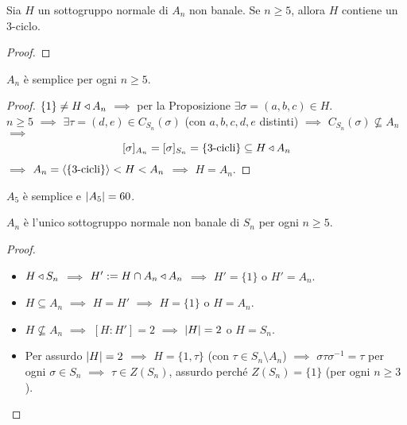 \begin{lemm}
Sia $H$ un sottogruppo normale di $A_n$ non banale. Se $n \ge 5$, allora $H$ contiene un $3$-ciclo.
\end{lemm}

\begin{proof}
\end{proof}

\begin{teor}
$A_n$ è semplice per ogni $n \ge 5$.
\end{teor}

\begin{proof}
$\{1\}\ne H \triangleleft A_n$ $\implies$ per la Proposizione $\exists\sigma=(a,b,c)\in H$. \\
$n\ge5$ $\implies$ $\exists\tau=(d,e)\in C_{S_n}(\sigma)$ (con $a,b,c,d,e$ distinti) $\implies$ $ C_{S_n}(\sigma)\not\subseteq A_n$ $\implies$
\[
[\sigma]_{A_n}=[\sigma]_{S_n}=\{\text{$3$-cicli}\}\subseteq H \triangleleft A_n
\]
$\implies$ $A_n=\left\langle\{\text{$3$-cicli}\}\right\rangle<H<A_n$ $\implies$ $H=A_n$.
\end{proof}
\begin{coro}
$A_5$ è semplice e $\left\lvert A_5\right\rvert=60$.
\end{coro}



\begin{coro}
$A_n$ è l'unico sottogruppo normale non banale di $S_n$ per ogni $n\ge5$.
\end{coro}
\begin{proof}
\begin{itemize}
\item $H \triangleleft S_n$ $\implies$ $H':=H\cap A_n \triangleleft A_n$ $\implies$ $H'=\{1\}$ o $H'=A_n$.
\item $H\subseteq A_n$ $\implies$ $H=H'$ $\implies$ $H=\{1\}$ o $H=A_n$.
\item $H\not\subseteq A_n$ $\implies$ $[H:H']=2$ $\implies$ $\left\lvert H\right\rvert=2$ o $H=S_n$.
\item Per assurdo $\left\lvert H\right\rvert=2$ $\implies$ $H=\{1,\tau\}$ (con $\tau\in S_n\setminus A_n$) $\implies$ $\sigma\tau\sigma^{-1}=\tau$ per ogni $\sigma\in S_n$ $\implies$ $\tau\in Z(S_n)$, assurdo perché $Z(S_n)=\{1\}$ (per ogni $n\ge3$). \qedhere
\end{itemize}
\end{proof}


